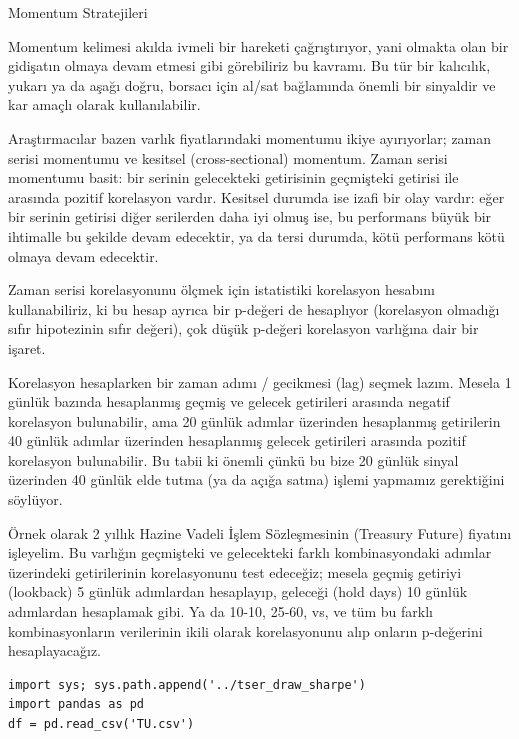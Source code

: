 \documentclass[12pt,fleqn]{article}\usepackage{../../common}
\begin{document}
Momentum Stratejileri

Momentum kelimesi akılda ivmeli bir hareketi çağrıştırıyor, yani olmakta
olan bir gidişatın olmaya devam etmesi gibi görebiliriz bu kavramı. Bu tür
bir kalıcılık, yukarı ya da aşağı doğru, borsacı için al/sat bağlamında
önemli bir sinyaldir ve kar amaçlı olarak kullanılabilir. 

Araştırmacılar bazen varlık fiyatlarındaki momentumu ikiye ayırıyorlar;
zaman serisi momentumu ve kesitsel (cross-sectional) momentum. Zaman serisi
momentumu basit: bir serinin gelecekteki getirisinin geçmişteki getirisi
ile arasında pozitif korelasyon vardır. Kesitsel durumda ise izafi bir olay
vardır: eğer bir serinin getirisi diğer serilerden daha iyi olmuş ise, bu
performans büyük bir ihtimalle bu şekilde devam edecektir, ya da tersi
durumda, kötü performans kötü olmaya devam edecektir. 

Zaman serisi korelasyonunu ölçmek için istatistiki korelasyon hesabını
kullanabiliriz, ki bu hesap ayrıca bir p-değeri de hesaplıyor (korelasyon
olmadığı sıfır hipotezinin sıfır değeri), çok düşük p-değeri korelasyon
varlığına dair bir işaret.

Korelasyon hesaplarken bir zaman adımı / gecikmesi (lag) seçmek
lazım. Mesela 1 günlük bazında hesaplanmış geçmiş ve gelecek getirileri
arasında negatif korelasyon bulunabilir, ama 20 günlük adımlar üzerinden
hesaplanmış getirilerin 40 günlük adımlar üzerinden hesaplanmış gelecek
getirileri arasında pozitif korelasyon bulunabilir. Bu tabii ki önemli
çünkü bu bize 20 günlük sinyal üzerinden 40 günlük elde tutma (ya da açığa
satma) işlemi yapmamız gerektiğini söylüyor.

Örnek olarak 2 yıllık Hazine Vadeli İşlem Sözleşmesinin (Treasury Future)
fiyatını işleyelim. Bu varlığın geçmişteki ve gelecekteki farklı
kombinasyondaki adımlar üzerindeki getirilerinin korelasyonunu test
edeceğiz; mesela geçmiş getiriyi (lookback) 5 günlük adımlardan hesaplayıp,
geleceği (hold days) 10 günlük adımlardan hesaplamak gibi. Ya da 10-10,
25-60, vs, ve tüm bu farklı kombinasyonların verilerinin ikili olarak
korelasyonunu alıp onların p-değerini hesaplayacağız.

\begin{verbatim}
import sys; sys.path.append('../tser_draw_sharpe')
import pandas as pd
df = pd.read_csv('TU.csv')
\end{verbatim}
\end{document}
